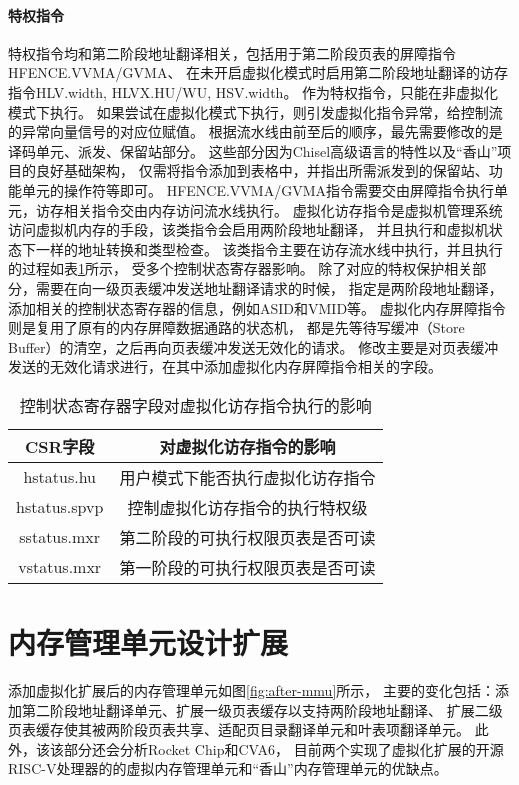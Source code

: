 \paragraph{特权指令}
特权指令均和第二阶段地址翻译相关，包括用于第二阶段页表的屏障指令HFENCE.VVMA/GVMA、
在未开启虚拟化模式时启用第二阶段地址翻译的访存指令HLV.width, HLVX.HU/WU, HSV.width。
作为特权指令，只能在非虚拟化模式下执行。
如果尝试在虚拟化模式下执行，则引发虚拟化指令异常，给控制流的异常向量信号的对应位赋值。
根据流水线由前至后的顺序，最先需要修改的是译码单元、派发、保留站部分。
这些部分因为Chisel高级语言的特性以及“香山”项目的良好基础架构，
仅需将指令添加到表格中，并指出所需派发到的保留站、功能单元的操作符等即可。
HFENCE.VVMA/GVMA指令需要交由屏障指令执行单元，访存相关指令交由内存访问流水线执行。
虚拟化访存指令是虚拟机管理系统访问虚拟机内存的手段，该类指令会启用两阶段地址翻译，
并且执行和虚拟机状态下一样的地址转换和类型检查。
该类指令主要在访存流水线中执行，并且执行的过程如表\ref{tab:h-ls}所示，
受多个控制状态寄存器影响。
除了对应的特权保护相关部分，需要在向一级页表缓冲发送地址翻译请求的时候，
指定是两阶段地址翻译，添加相关的控制状态寄存器的信息，例如ASID和VMID等。
虚拟化内存屏障指令则是复用了原有的内存屏障数据通路的状态机，
都是先等待写缓冲（Store Buffer）的清空，之后再向页表缓冲发送无效化的请求。
修改主要是对页表缓冲发送的无效化请求进行，在其中添加虚拟化内存屏障指令相关的字段。

\begin{table}
    \centering
    \caption{控制状态寄存器字段对虚拟化访存指令执行的影响}
    \begin{tabular}{cc}
        \toprule
        CSR字段        & 对虚拟化访存指令的影响      \\
        \midrule
        hstatus.hu   & 用户模式下能否执行虚拟化访存指令 \\
        hstatus.spvp & 控制虚拟化访存指令的执行特权级  \\
        sstatus.mxr  & 第二阶段的可执行权限页表是否可读 \\
        vstatus.mxr  & 第一阶段的可执行权限页表是否可读 \\
        \bottomrule
    \end{tabular}
    \label{tab:h-ls}
\end{table}

\section{内存管理单元设计扩展}
添加虚拟化扩展后的内存管理单元如图\ref{fig:after-mmu}所示，
主要的变化包括：添加第二阶段地址翻译单元、扩展一级页表缓存以支持两阶段地址翻译、
扩展二级页表缓存使其被两阶段页表共享、适配页目录翻译单元和叶表项翻译单元。
此外，该该部分还会分析Rocket Chip和CVA6，
目前两个实现了虚拟化扩展的开源RISC-V处理器的的虚拟内存管理单元和“香山”内存管理单元的优缺点。


